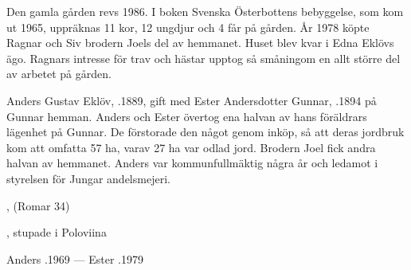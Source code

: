 Den gamla gården revs 1986. I boken Svenska Österbottens bebyggelse, som  kom ut 1965, uppräknas 11 kor, 12 ungdjur och 4 får på gården. År 1978 köpte Ragnar och Siv brodern Joels del av hemmanet. Huset blev kvar i Edna Eklövs ägo. Ragnars intresse för trav och hästar upptog så småningom en allt större del av arbetet på gården.


Anders Gustav Eklöv, .1889, gift med Ester Andersdotter Gunnar, .1894 på Gunnar hemman. Anders och Ester övertog ena halvan av hans föräldrars lägenhet på Gunnar. De förstorade den något genom inköp, så att deras jordbruk kom att omfatta 57 ha, varav 27 ha var odlad jord. Brodern Joel fick andra halvan av hemmanet. Anders var kommunfullmäktig några år och ledamot i styrelsen för Jungar andelsmejeri.
\begin{jhchildren}
  \item {}
  \item {}, (Romar 34)
  \item {}
  \item {}
  \item {}, stupade i Poloviina
  \item {}
  \item {}
  \item {}
  \item {}
  \item {}
  \item {}
  \item {}
\end{jhchildren}

Anders .1969  ---  Ester .1979


